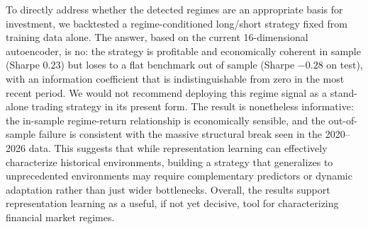 \documentclass[conference]{IEEEtran}
\begin{document}
To directly address whether the detected regimes are an appropriate basis for
investment, we backtested a regime-conditioned long/short strategy fixed from
training data alone. The answer, based on the current 16-dimensional
autoencoder, is no: the strategy is profitable and economically coherent in
sample (Sharpe $0.23$) but loses to a flat benchmark out of sample (Sharpe
$-0.28$ on test), with an information coefficient that is indistinguishable
from zero in the most recent period. We would not recommend deploying this
regime signal as a stand-alone trading strategy in its present form. The result
is nonetheless informative: the in-sample regime-return relationship is
economically sensible, and the out-of-sample failure is consistent with the massive
structural break seen in the 2020--2026 data. This suggests that while representation
learning can effectively characterize historical environments, building a strategy
that generalizes to unprecedented environments may require complementary predictors
or dynamic adaptation rather than just wider bottlenecks.
Overall, the results support representation learning as a useful, if not
yet decisive, tool for characterizing financial market regimes.



\end{document}
